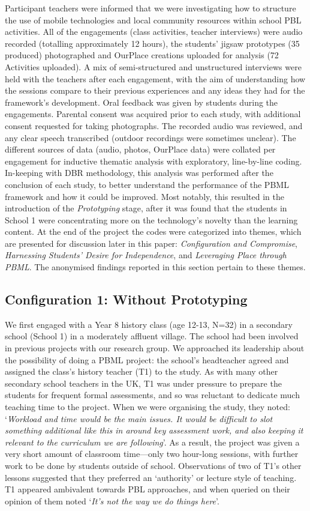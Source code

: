 \documentclass[,hyphens]{sigchi}
\begin{document}
Participant teachers were informed that we were investigating how to structure the use of mobile technologies and local community resources within school PBL activities. All of the engagements (class activities, teacher interviews) were audio recorded (totalling approximately 12 hours), the students' jigsaw prototypes (35 produced) photographed and OurPlace creations uploaded for analysis (72 Activities uploaded). A mix of semi-structured and unstructured interviews were held with the teachers after each engagement, with the aim of understanding how the sessions compare to their previous experiences and any ideas they had for the framework's development. Oral feedback was given by students during the engagements. Parental consent was acquired prior to each study, with additional consent requested for taking photographs. The recorded audio was reviewed, and any clear speech transcribed (outdoor recordings were sometimes unclear). The different sources of data (audio, photos, OurPlace data) were collated per engagement for inductive thematic analysis with exploratory, line-by-line coding. In-keeping with DBR methodology, this analysis was performed after the conclusion of each study, to better understand the performance of the PBML framework and how it could be improved. Most notably, this resulted in the introduction of the \textit{Prototyping} stage, after it was found that the students in School 1 were concentrating more on the technology's novelty than the learning content. At the end of the project the codes were categorized into themes, which are presented for discussion later in this paper: \textit{Configuration and Compromise}, \textit{Harnessing Students' Desire for Independence}, and \textit{Leveraging Place through PBML}. The anonymised findings reported in this section pertain to these themes.

\subsection{Configuration 1: Without Prototyping}
We first engaged with a Year 8 history class (age 12-13, N=32) in a secondary school (School 1) in a moderately affluent village. The school had been involved in previous projects with our research group. We approached its leadership about the possibility of doing a PBML project: the school's headteacher agreed and assigned the class's history teacher (T1) to the study. As with many other secondary school teachers in the UK, T1 was under pressure to prepare the students for frequent formal assessments, and so was reluctant to dedicate much teaching time to the project. When we were organising the study, they noted: `\textit{Workload and time would be the main issues. It would be difficult to slot something additional like this in around key assessment work, and also keeping it relevant to the curriculum we are following}'. As a result, the project was given a very short amount of classroom time---only two hour-long sessions, with further work to be done by students outside of school. Observations of two of T1's other lessons suggested that they preferred an `authority' or lecture style of teaching. T1 appeared ambivalent towards PBL approaches, and when queried on their opinion of them noted `\textit{It's not the way we do things here}'.
\end{document}
